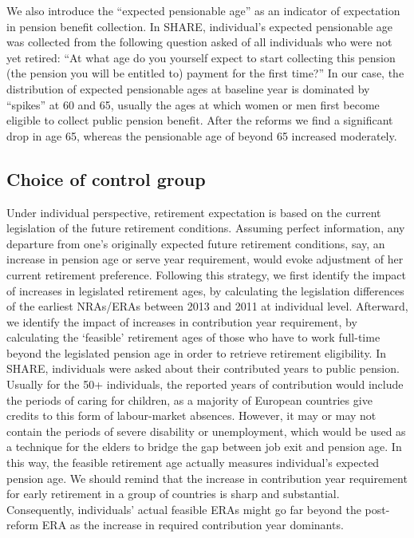 \documentclass[a4paper]{article}
\begin{document}
We also introduce the “expected pensionable age” as an indicator of expectation in pension benefit collection. In SHARE, individual’s expected pensionable age was collected from the following question asked of all individuals who were not yet retired: “At what age do you yourself expect to start collecting this pension (the pension you will be entitled to) payment for the first time?” In our case, the distribution of expected pensionable ages at baseline year is dominated by “spikes” at 60 and 65, usually the ages at which women or men first become eligible to collect public pension benefit. After the reforms we find a significant drop in age 65, whereas the pensionable age of beyond 65 increased moderately.

\subsection{Choice of control group}

Under individual perspective, retirement expectation is based on the current legislation of the future retirement conditions. Assuming perfect information, any departure from one’s originally expected future retirement conditions, say, an increase in pension age or serve year requirement, would evoke adjustment of her current retirement preference. Following this strategy, we first identify the impact of increases in legislated retirement ages, by calculating the legislation differences of the earliest NRAs/ERAs between 2013 and 2011 at individual level. Afterward, we identify the impact of increases in contribution year requirement, by calculating the ‘feasible’ retirement ages of those who have to work full-time beyond the legislated pension age in order to retrieve retirement eligibility. In SHARE, individuals were asked about their contributed years to public pension. Usually for the 50+ individuals, the reported years of contribution would include the periods of caring for children, as a majority of European countries give credits to this form of labour-market absences. However, it may or may not contain the periods of severe disability or unemployment, which would be used as a technique for the elders to bridge the gap between job exit and pension age. In this way, the feasible retirement age actually measures individual’s expected pension age. We should remind that the increase in contribution year requirement for early retirement in a group of countries is sharp and substantial. Consequently, individuals’ actual feasible ERAs might go far beyond the post-reform ERA as the increase in required contribution year dominants. 
\end{document}
